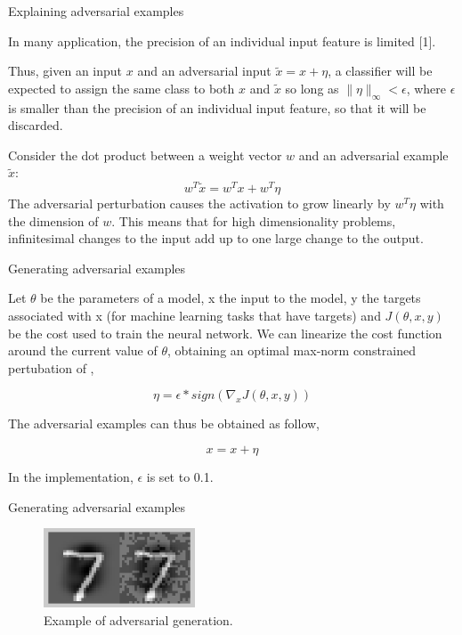 \begin{tframe}{Explaining adversarial examples}

In many application, the precision of an individual input feature is limited [1].

\vspace{0.1in}

Thus, given an input $ x $ and an adversarial input $ \tilde{x} = x + \eta $, a classifier will be expected to assign the same class to both $x$ and $\tilde{x}$ so long as $ \parallel \eta \parallel_\infty < \epsilon $, where $\epsilon$ is smaller than the precision of an individual input feature, so that it will be discarded.

\vspace{0.1in}

Consider the dot product between a weight vector $w$ and an adversarial example $\tilde{x}$:
$$ w^{T}\tilde{x} = w^{T}x + w^{T}\eta $$
The adversarial perturbation causes the activation to grow linearly by $w^{T}\eta$ with the dimension of $w$. This means that for high dimensionality problems, infinitesimal changes to the input add up to one large change to the output.

\end{tframe}


\begin{tframe}{Generating adversarial examples}

Let $\theta$ be the parameters of a model, x the input to the model, y the targets associated with x (for machine learning tasks that have targets) and $J(\theta, x, y)$ be the cost used to train the neural network. 
We can linearize the cost function around the current value of $\theta$, obtaining an optimal max-norm constrained pertubation of ,

$$ \eta = \epsilon * sign(\nabla_x J(\theta, x, y)) $$

The adversarial examples can thus be obtained as follow,

$$ x = x + \eta $$

In the implementation, $ \epsilon $ is set to 0.1.

\end{tframe}


\begin{tframe}{Generating adversarial examples}

\vspace{0.1in}
\vspace{0.1in}
\vspace{0.1in}

\begin{figure}
  \includegraphics[width=0.4\textwidth]{img/clean-adv.png}
  \caption{Example of adversarial generation.}
\end{figure}

\end{tframe}